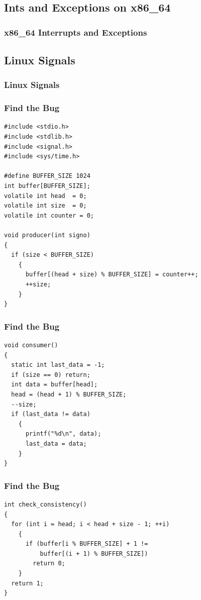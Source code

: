 \documentclass{beamer}
\begin{document}
\subsection{Ints and Exceptions on x86\_64}

\begin{frame}%
\frametitle{x86\_64 Interrupts and Exceptions}


\end{frame}


\subsection{Linux Signals}

\begin{frame}%
\frametitle{Linux Signals}


\end{frame}

\lstset{language = c++, frameround = fttt, frame=trBL}

\begin{frame}[fragile]
\frametitle{Find the Bug}
\scriptsize

\begin{lstlisting}
#include <stdio.h>
#include <stdlib.h>
#include <signal.h>
#include <sys/time.h>

#define BUFFER_SIZE 1024
int buffer[BUFFER_SIZE];
volatile int head  = 0;
volatile int size  = 0;
volatile int counter = 0;

void producer(int signo)
{
  if (size < BUFFER_SIZE)
    {
      buffer[(head + size) % BUFFER_SIZE] = counter++;
      ++size;
    }
}
\end{lstlisting}

\end{frame}

\begin{frame}[fragile]
\frametitle{Find the Bug}
\scriptsize

\begin{lstlisting}[firstnumber=20]
void consumer()
{
  static int last_data = -1;
  if (size == 0) return;
  int data = buffer[head];
  head = (head + 1) % BUFFER_SIZE;
  --size;
  if (last_data != data)
    {
      printf("%d\n", data);
      last_data = data;
    }
}
\end{lstlisting}

\end{frame}

\begin{frame}[fragile]
\frametitle{Find the Bug}
\scriptsize

\begin{lstlisting}[firstnumber=33]
int check_consistency()
{
  for (int i = head; i < head + size - 1; ++i)
    {
      if (buffer[i % BUFFER_SIZE] + 1 !=
          buffer[(i + 1) % BUFFER_SIZE])
        return 0;
    }
  return 1;
}
\end{lstlisting}

\end{frame}
\end{document}
